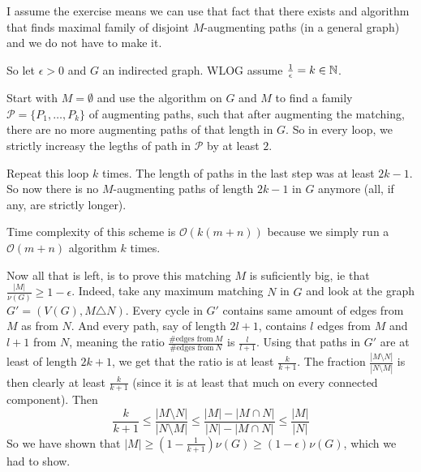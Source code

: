 \begin{exercise}{2}
    I assume the exercise means we can use that fact that there exists and
    algorithm that finds maximal family of disjoint $M$-augmenting paths (in a
    general graph) and we do not have to make it.

    So let $\epsilon > 0$ and $G$ an indirected graph. WLOG assume
    $\frac{1}{\epsilon} = k \in \mathbb{N}$.

    Start with $M = \emptyset$ and use the algorithm on $G$ and $M$ to find a
    family $\mathcal{P} = \{ P_1, \dots, P_k \}$ of augmenting paths, such that
    after augmenting the matching, there are no more augmenting paths of that
    length in $G$. So in every loop, we strictly increasy the legths of path in
    $\mathcal{P}$ by at least $2$.

    Repeat this loop $k$ times. The length of paths in the last step was at
    least $2 k - 1$. So now there is no $M$-augmenting paths of length $2 k - 1$
    in $G$ anymore (all, if any, are strictly longer).

    Time complexity of this scheme is $\mathcal{O}(k (m + n))$ because we simply
    run a $\mathcal{O}(m + n)$ algorithm $k$ times.

    Now all that is left, is to prove this matching $M$ is suficiently big, ie
    that $\frac{|M|}{\nu(G)} \geq 1 - \epsilon$. Indeed, take any maximum
    matching $N$ in $G$ and look at the graph $G' = (V(G), M \triangle N)$.
    Every cycle in $G'$ contains same amount of edges from $M$ as from $N$. And
    every path, say of length $2 l + 1$, contains $l$ edges from $M$ and $l + 1$
    from $N$, meaning the ratio $\frac{\text{\# edges from}\ M}{\text{\# edges
    from}\ N}$ is $\frac{l}{l+1}$. Using that paths in $G'$ are at least of
    length $2 k + 1$, we get that the ratio is at least $\frac{k}{k + 1}$. The
    fraction $\frac{|M \setminus N|}{|N \setminus M|}$ is then clearly at least
    $\frac{k}{k + 1}$ (since it is at least that much on every connected
    component). Then
    \begin{equation*}
        \frac{k}{k + 1} \leq
        \frac{|M \setminus N|}{|N \setminus M|} \leq
        \frac{|M| - |M \cap N|}{|N| - |M \cap N|} \leq 
        \frac{|M|}{|N|}
    \end{equation*}
    So we have shown that $|M| \geq (1 - \frac{1}{k + 1}) \nu(G) \geq (1 -
    \epsilon) \nu(G)$, which we had to show.
\end{exercise}



